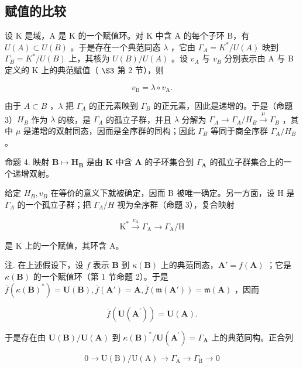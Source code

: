 \subsection{赋值的比较}

设 K 是域，A 是 K 的一个赋值环。对 K 中含 A 的每个子环 B，有 \(U(A) \subset U(B)\) 。于是存在一个典范同态 \(\lambda\) ，它由 \(\Gamma_{A} = K^{*}/U(A)\) 映到 \(\Gamma_{B} = K^{*}/U(B)\) 上，其核为 \(U(B)/U(A)\) 。设 \(v_{A}\) 与 \(v_{B}\) 分别表示由 A 与 B 定义的 K 上的典范赋值（ \(\S 3\) 第 2 节），则

\[
v _ {\mathrm{B}} = \lambda \circ v _ {\mathrm{A}}.\tag{1}
\]

由于 \(A \subset B\) ，\(\lambda\) 把 \(\Gamma_{A}\) 的正元素映到 \(\Gamma_{B}\) 的正元素，因此是递增的。于是（命题 3）\(H_{B}\) 作为 \(\lambda\) 的核，是 \(\Gamma_{A}\) 的孤立子群，并且 \(\lambda\) 分解为 \(\Gamma_{A} \to \Gamma_{A}/H_{B} \xrightarrow{\mu} \Gamma_{B}\) ，其中 \(\mu\) 是递增的双射同态，因而是全序群的同构；因此 \(\Gamma_{B}\) 等同于商全序群 \(\Gamma_{A}/H_{B}\) 。

命题 4. 映射 \(\mathbf{B} \mapsto \mathbf{H}_{\mathbf{B}}\) 是由 \(\mathbf{K}\) 中含 \(\mathbf{A}\) 的子环集合到 \(\Gamma_{\mathbf{A}}\) 的孤立子群集合上的一个递增双射。

给定 \(H_{B}, v_{B}\) 在等价的意义下就被确定，因而 B 被唯一确定。另一方面，设 H 是 \(\Gamma_{A}\) 的一个孤立子群；把 \(\Gamma_{A}/H\) 视为全序群（命题 3），复合映射

\[
\mathrm{K} ^ {*} \xrightarrow {v _ {\mathrm{A}}} \Gamma_ {\mathrm{A}} \longrightarrow \Gamma_ {\mathrm{A}} / \mathrm{H}
\]

是 K 上的一个赋值，其环含 A。

注. 在上述假设下，设 \(f\) 表示 \(\mathbf{B}\) 到 \(\kappa(\mathbf{B})\) 上的典范同态，\(\mathbf{A}' = f(\mathbf{A})\) ；它是 \(\kappa(\mathbf{B})\) 的一个赋值环（第 1 节命题 2）。于是 \(\overline{f}(\kappa(\mathbf{B})^*) = \mathbf{U}(\mathbf{B}), \overline{f}(\mathbf{A}') = \mathbf{A}, \overline{f}(\mathfrak{m}(\mathbf{A}')) = \mathfrak{m}(\mathbf{A})\) ，因而

\[
\overline {{f}} (\mathbf {U} (\mathbf {A} ^ {\prime})) = \mathbf {U} (\mathbf {A}).
\]

于是存在由 \(\mathbf{U}(\mathbf{B}) / \mathbf{U}(\mathbf{A})\) 到 \(\kappa (\mathbf{B})^{*} / \mathbf{U}(\mathbf{A}^{\prime}) = \Gamma_{\mathbf{A}}\) 上的典范同构。正合列

\[
0 \rightarrow \mathrm{U(B)} / \mathrm{U(A)} \rightarrow \Gamma_ {\mathrm{A}} \rightarrow \Gamma_ {\mathrm{B}} \rightarrow 0
\]

